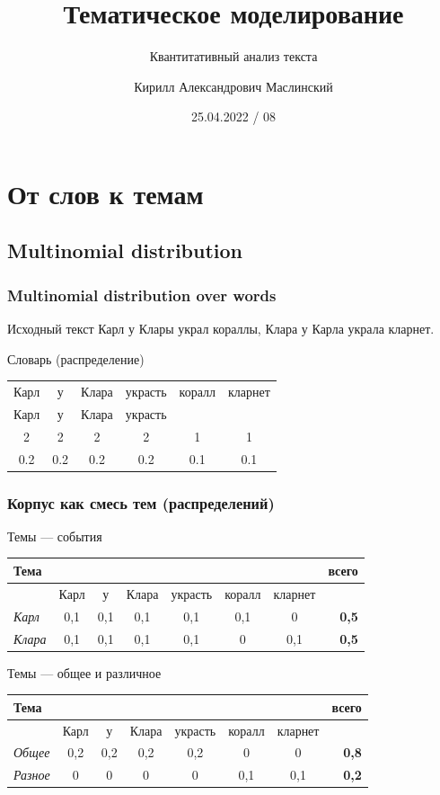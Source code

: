 \documentclass[10pt,svgnames]{beamer}
\title[QTA 08] %
{Тематическое моделирование}
\subtitle
{Квантитативный анализ текста} %
\author%
{Кирилл Александрович Маслинский}
\institute%
{ЕУСПб}
\date%
{25.04.2022 / 08}
\begin{document}
\begin{frame}
  \titlepage
\end{frame}

\section{От слов к темам}

\subsection{Multinomial distribution}

\begin{frame}
  \frametitle{Multinomial distribution over words}

  \begin{block}{Исходный текст}
    Карл у Клары украл кораллы, Клара у Карла украла кларнет.
  \end{block}
  
  \begin{block}{Словарь (распределение)}
    \begin{tabular}[c]{cccccc} 
      Карл&у&Клара&украсть&коралл&кларнет\\
      Карл&у&Клара&украсть&      &       \\ 
      2 & 2& 2 & 2& 1& 1\\
      0.2 & 0.2 & 0.2 & 0.2 & 0.1 & 0.1 \\
    \end{tabular}
  \end{block}
\end{frame}

\begin{frame}
  \frametitle{Корпус как смесь тем (распределений)}
  \footnotesize
  \begin{block}{Темы — события}
    \begin{tabular}[c]{lccccccr}
      Тема &&&&&&& всего \\
      \hline
      & Карл&у&Клара&украсть&коралл&кларнет&\\
     \textit{Карл}& 0,1 & 0,1 & 0,1 & 0,1 & 0,1 & \alert{0} & \textbf{0,5} \\
      \textit{Клара} & 0,1 & 0,1 & 0,1 & 0,1 & \alert{0} & 0,1 & \textbf{0,5}\\
    \end{tabular}
  \end{block}

  \begin{block}{Темы — общее и различное}
    \begin{tabular}[c]{lccccccr}
      Тема &&&&&&& всего \\
      \hline
      & Карл&у&Клара&украсть&коралл&кларнет&\\
     \textit{Общее} & 0,2 & 0,2 & 0,2 & 0,2 & 0 & 0 & \textbf{0,8}\\
      \textit{Разное} & 0 & 0 & 0 & 0 & 0,1 & 0,1 & \textbf{0,2}\\ 
    \end{tabular}
  \end{block}
\end{frame}
\end{document}
